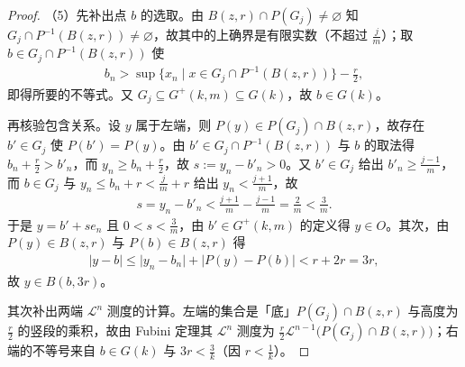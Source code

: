 \documentclass[../../main.tex]{subfiles}%
\begin{document}
\begin{proof}
（5）先补出点 $b$ 的选取。由 $B(z,r)\cap P(G_j)\neq\varnothing$ 知 $G_j\cap P^{-1}(B(z,r))\neq\varnothing$，故其中的上确界是有限实数（不超过 $\frac{j}{m}$）；取 $b\in G_j\cap P^{-1}(B(z,r))$ 使
\begin{align*}
b_n>\sup\bigl\{x_n\mid x\in G_j\cap P^{-1}(B(z,r))\bigr\}-\frac r2,
\end{align*}
即得所要的不等式。又 $G_j\subseteq G^{+}(k,m)\subseteq G(k)$，故 $b\in G(k)$。

再核验包含关系。设 $y$ 属于左端，则 $P(y)\in P(G_j)\cap B(z,r)$，故存在 $b'\in G_j$ 使 $P(b')=P(y)$。由 $b'\in G_j\cap P^{-1}(B(z,r))$ 与 $b$ 的取法得 $b_n+\frac r2>b'_n$，而 $y_n\geqslant b_n+\frac r2$，故 $s:=y_n-b'_n>0$。又 $b'\in G_j$ 给出 $b'_n\geqslant\frac{j-1}{m}$，而 $b\in G_j$ 与 $y_n\leqslant b_n+r<\frac{j}{m}+r$ 给出 $y_n<\frac{j+1}{m}$，故
\begin{align*}
s=y_n-b'_n<\frac{j+1}{m}-\frac{j-1}{m}=\frac{2}{m}<\frac3m .
\end{align*}
于是 $y=b'+se_n$ 且 $0<s<\frac3m$，由 $b'\in G^{+}(k,m)$ 的定义得 $y\in O$。其次，由 $P(y)\in B(z,r)$ 与 $P(b)\in B(z,r)$ 得
\begin{align*}
\lvert y-b\rvert\leqslant\lvert y_n-b_n\rvert+\lvert P(y)-P(b)\rvert<r+2r=3r,
\end{align*}
故 $y\in B(b,3r)$。

其次补出两端 $\mathcal{L}^n$ 测度的计算。左端的集合是「底」$P(G_j)\cap B(z,r)$ 与高度为 $\frac r2$ 的竖段的乘积，故由 Fubini 定理其 $\mathcal{L}^n$ 测度为 $\frac r2\mathcal{L}^{n-1}\bigl(P(G_j)\cap B(z,r)\bigr)$；右端的不等号来自 $b\in G(k)$ 与 $3r<\frac3k$（因 $r<\frac1k$）。


\end{proof}
\end{document}
